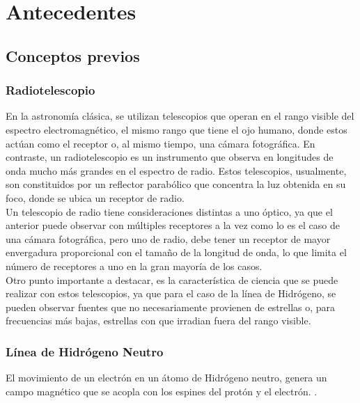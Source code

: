 \chapter{Antecedentes}
\section{Conceptos previos}
\subsection{Radiotelescopio}

En la astronomía clásica, se utilizan telescopios que operan en el rango visible del espectro electromagnético, el mismo rango que tiene el ojo humano, donde estos actúan como el receptor o, al mismo tiempo, una cámara fotográfica. En contraste, un radiotelescopio es un instrumento que observa en longitudes de onda mucho más grandes en el espectro de radio. Estos telescopios, usualmente, son constituidos por un reflector parabólico que concentra la luz obtenida en su foco, donde se ubica un receptor de radio.\\

Un telescopio de radio tiene consideraciones distintas a uno óptico, ya que el anterior puede observar con múltiples receptores a la vez como lo es el caso de una cámara fotográfica, pero uno de radio, debe tener un receptor de mayor envergadura proporcional con el tamaño de la longitud de onda, lo que limita el número de receptores a uno en la gran mayoría de los casos.\\

Otro punto importante a destacar, es la característica de ciencia que se puede realizar con estos telescopios, ya que para el caso de la línea de Hidrógeno, se pueden observar fuentes que no necesariamente provienen de estrellas o, para frecuencias más bajas, estrellas con que irradian fuera del rango visible.

\subsection{Línea de Hidrógeno Neutro}

El movimiento de un electrón en un átomo de Hidrógeno neutro, genera un campo magnético que se acopla con los espines del protón y el electrón.  \cite{Restrepo2023}.\\

